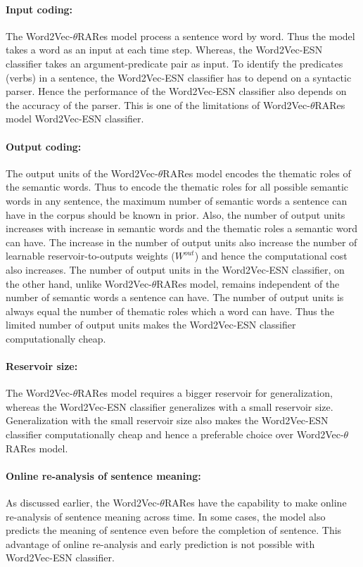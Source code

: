 \paragraph{Input coding:} The Word2Vec-$\theta$RARes model process a sentence word by word. Thus the model takes a word as an input at each time step. Whereas, the Word2Vec-ESN classifier takes an argument-predicate pair as input. To identify the predicates (verbs) in a sentence, the Word2Vec-ESN classifier has to depend on a syntactic parser. Hence the performance of the Word2Vec-ESN classifier also depends on the accuracy of the parser. This is one of the limitations of Word2Vec-$\theta$RARes model Word2Vec-ESN classifier.

\paragraph{Output coding:} The output units of the Word2Vec-$\theta$RARes model encodes the thematic roles of the semantic words. Thus to encode the thematic roles for all possible semantic words in any sentence, the maximum number of semantic words a sentence can have in the corpus should be known in prior. Also, the number of output units increases with increase in semantic words and the thematic roles a semantic word can have. The increase in the number of output units also increase the number of learnable reservoir-to-outputs weights ($W^{out}$) and hence the computational cost also increases. The number of output units in the Word2Vec-ESN classifier, on the other hand, unlike Word2Vec-$\theta$RARes model, remains independent of the number of semantic words a sentence can have. The number of output units is always equal the number of thematic roles which a word can have. Thus the limited number of output units makes the Word2Vec-ESN classifier computationally cheap. 

\paragraph{Reservoir size:} The Word2Vec-$\theta$RARes model requires a bigger reservoir for generalization, whereas the Word2Vec-ESN classifier generalizes with a small reservoir size. Generalization with the small reservoir size also makes the Word2Vec-ESN classifier computationally cheap and hence a preferable choice over Word2Vec-$\theta$RARes model.

\paragraph{Online re-analysis of sentence meaning:} As discussed earlier, the Word2Vec-$\theta$RARes have the capability to make online re-analysis of sentence meaning across time. In some cases, the model also predicts the meaning of sentence even before the completion of sentence. This advantage of online re-analysis and early prediction is not possible with Word2Vec-ESN classifier.

